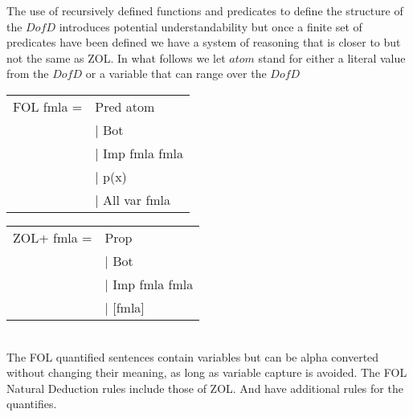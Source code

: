 The use of recursively defined functions and predicates to define the structure of the $DofD$ introduces potential understandability but once a finite set of predicates have been defined we have a system of reasoning that is closer to but not the same as ZOL. In what follows we let $atom$ stand for either a literal value from the $DofD$ or a variable that can range over the $DofD$

 \hspace{\fill}
\begin{minipage}{2in}
\begin{tabular}{ll}
FOL fmla \; = & \; Pred atom  \\ 
& $|$ Bot\\ 
& $|$  Imp fmla fmla \\ 
& $|$  p(x) \\
& $|$  All var fmla \\

\end{tabular}
\end{minipage}
 \hspace{\fill}
 \begin{minipage}{2in}
 \begin{tabular}{ll}
ZOL+ fmla \; = & \; Prop   \\ 
& $|$ Bot\\ 
& $|$  Imp fmla fmla \\ 
& $|$  [fmla] \\ 
\end{tabular}
 \end{minipage}  
\hspace{\fill}\\

The FOL quantified sentences contain variables but can be alpha converted without changing their meaning, as long as variable capture is avoided. The FOL Natural Deduction rules include those of ZOL. And have additional rules for the quantifies. 

\hspace{\fill}
\begin{minipage}{2in}
\begin{prooftree}
 
\end{prooftree}
\end{minipage}
\begin{minipage}{1in}
\begin{prooftree}
 
\end{prooftree}
\end{minipage}
\hspace{\fill}

